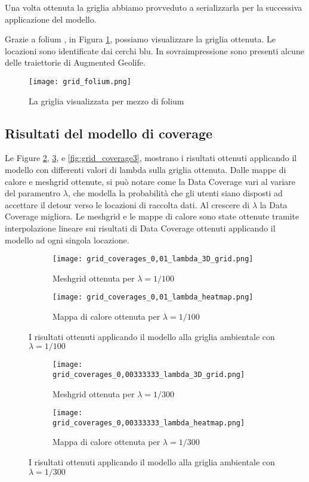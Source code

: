 Una volta ottenuta la griglia abbiamo provveduto a serializzarla per la successiva applicazione del modello.

Grazie a folium \cite{folium}, in Figura \ref{fig:grid}, possiamo visualizzare la griglia ottenuta.
Le locazioni sono identificate dai cerchi blu.
In sovraimpressione sono presenti alcune delle traiettorie di Augmented Geolife.

\begin{figure}[H]
	\centering 
	\texttt{[image: grid\_folium.png]}
	\caption[Griglia visualizzata con folium]{La griglia visualizzata per mezzo di folium}
	\label{fig:grid}
\end{figure}

\subsection{Risultati del modello di coverage}
Le Figure \ref{fig:grid_coverage1}, \ref{fig:grid_coverage2}, e \ref{fig:grid_coverage3}, mostrano i risultati ottenuti applicando il modello con differenti valori di lambda sulla griglia ottenuta. 
Dalle mappe di calore e meshgrid ottenute, si può notare come la Data Coverage vari al variare del paramentro $\lambda$, che modella la probabilità che gli utenti siano disposti ad accettare il detour verso le locazioni di raccolta dati.
Al crescere di $\lambda$ la Data Coverage migliora.
Le meshgrid e le mappe di calore sono state ottenute tramite interpolazione lineare sui risultati di Data Coverage ottenuti applicando il modello ad ogni singola locazione.

\begin{figure}[H]
	\centering
	\begin{subfigure}[b]{\linewidth}
		\texttt{[image: grid\_coverages\_0,01\_lambda\_3D\_grid.png]}
		\caption{Meshgrid ottenuta per $\lambda = 1/100$}
	\end{subfigure}
	\begin{subfigure}[b]{\linewidth}
		\texttt{[image: grid\_coverages\_0,01\_lambda\_heatmap.png]}
		\caption{Mappa di calore ottenuta per $\lambda = 1/100$}
	\end{subfigure}
	\caption[Risultati griglia, $\lambda = 1/100$]{I risultati ottenuti applicando il modello alla griglia ambientale con $\lambda = 1/100$}
	\label{fig:grid_coverage1}
\end{figure}

\begin{figure}[H]
	\centering
	\begin{subfigure}[b]{\linewidth}
		\texttt{[image: grid\_coverages\_0,00333333\_lambda\_3D\_grid.png]}
		\caption{Meshgrid ottenuta per $\lambda = 1/300$}
	\end{subfigure}
	\begin{subfigure}[b]{\linewidth}
		\texttt{[image: grid\_coverages\_0,00333333\_lambda\_heatmap.png]}
		\caption{Mappa di calore ottenuta per $\lambda = 1/300$}
	\end{subfigure}
	\caption[Risultati griglia, $\lambda = 1/300$]{I risultati ottenuti applicando il modello alla griglia ambientale con $\lambda = 1/300$}
	\label{fig:grid_coverage2}
\end{figure}

